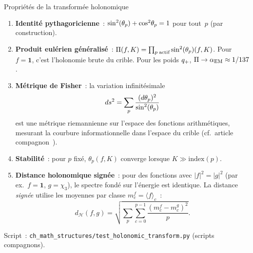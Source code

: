 \documentclass[12pt,a4paper]{article}
\begin{document}
\begin{thmbox}{Propriétés de la transformée holonomique}
\label{thm:holonomic_properties}
\begin{enumerate}[nosep]
\item \textbf{Identité pythagoricienne}~:
  $\sin^2(\theta_{p}) + \cos^2\!\theta_p = 1$ pour tout~$p$ (par construction).
\item \textbf{Produit eulérien généralisé}~:
  $\Pi(f,K) = \prod_{p\;\text{actif}} \sin^2(\theta_{p})(f,K)$.
  Pour $f = \mathbf{1}$, c'est l'holonomie brute du crible.
  Pour les poids $q_{+}$, $\Pi \to \alpha_{\mathrm{EM}} \approx 1/137$.
\item \textbf{Métrique de Fisher}~: la variation infinitésimale
  \begin{equation}
    ds^2 = \sum_p \frac{(d\theta_p)^2}{\sin^2(\theta_{p})}
    \label{eq:fisher_holonomic}
  \end{equation}
  est une métrique riemannienne sur l'espace des fonctions
  arithmétiques, mesurant la courbure informationnelle dans l'espace
  du crible (cf.\ article compagnon~\cite{companion_M2}).
\item \textbf{Stabilité}~: pour $p$ fixé, $\theta_p(f,K)$ converge
  lorsque $K \gg \mathrm{index}(p)$.
\item \textbf{Distance holonomique signée}~: pour des fonctions avec
  $|f|^2 = |g|^2$ (par ex.\ $f = \mathbf{1}$, $g = \chi_3$), le
  spectre fondé sur l'énergie est identique. La distance
  \emph{signée} utilise les moyennes par classe
  $m_c^f = \langle f \rangle_c$~:
  \begin{equation}
    d_{\mathcal{H}}(f,g)
    = \sqrt{\sum_p \sum_{c=0}^{p-1}
      \frac{(m_c^f - m_c^g)^2}{p}}.
    \label{eq:holonomic_distance}
  \end{equation}
\end{enumerate}
Script~: \texttt{ch\_math\_structures/test\_holonomic\_transform.py}
(scripts compagnons).
\end{thmbox}
\end{document}
